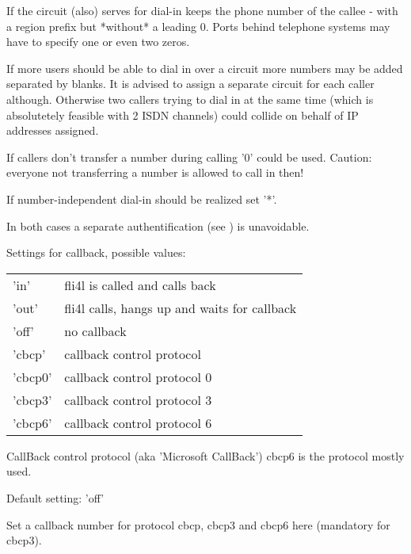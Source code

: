 \begin{description}

  If the circuit (also) serves for dial-in  keeps the 
  phone number of the callee - with a region prefix but *without* a leading 0. Ports 
  behind telephone systems may have to specify one or even two zeros.
  
  If more users should be able to dial in over a circuit more numbers may be added separated 
  by blanks. It is advised to assign a separate circuit for each caller although. Otherwise two callers 
  trying to dial in at the same time (which is absolutetely feasible with 2 ISDN channels) 
  could collide on behalf of IP addresses assigned.
  
  If callers don't transfer a number during calling '0' could be used.
  Caution: everyone not transferring a number is allowed to call in then!
  
  If number-independent dial-in should be realized set '*'.

  In both cases a separate authentification (see ) is unavoidable.

  
  Settings for callback, possible values:

  \begin{tabular}[h!]{ll}
        'in' &     fli4l is called and calls back\\
        'out' &    fli4l calls, hangs up and waits for callback \\
        'off' &    no callback\\
        'cbcp' &   callback control protocol\\
        'cbcp0' &  callback control protocol 0\\
        'cbcp3' &  callback control protocol 3\\
        'cbcp6' &  callback control protocol 6\\

  \end{tabular}

  CallBack control protocol (aka 'Microsoft CallBack')
  cbcp6 is the protocol mostly used.

  Default setting: 'off'


  Set a callback number for protocol cbcp, cbcp3 and cbcp6 here (mandatory for cbcp3).


\end{description}
